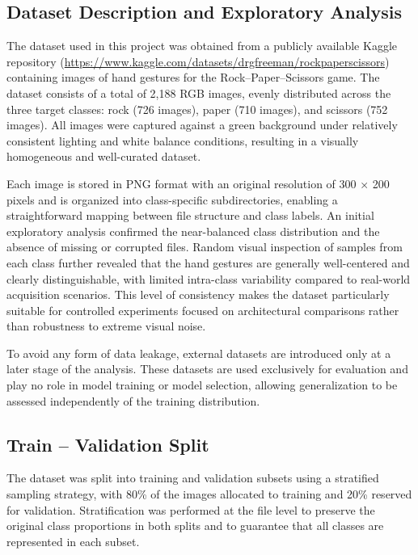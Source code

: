 \documentclass{article}
\begin{document}
\subsection{Dataset Description and Exploratory Analysis}

The dataset used in this project was obtained from a publicly available
Kaggle repository (\url{https://www.kaggle.com/datasets/drgfreeman/rockpaperscissors}) containing images of hand gestures for the
Rock--Paper--Scissors game. The dataset consists of a total of 2,188 RGB images,
evenly distributed across the three target classes: rock (726 images),
paper (710 images), and scissors (752 images). All images were captured
against a green background under relatively consistent lighting and
white balance conditions, resulting in a visually homogeneous and
well-curated dataset.

Each image is stored in PNG format with an original resolution of 300 ×
200 pixels and is organized into class-specific subdirectories, enabling
a straightforward mapping between file structure and class labels. An
initial exploratory analysis confirmed the near-balanced class
distribution and the absence of missing or corrupted files. Random
visual inspection of samples from each class further revealed that the
hand gestures are generally well-centered and clearly distinguishable,
with limited intra-class variability compared to real-world acquisition
scenarios. This level of consistency makes the dataset particularly
suitable for controlled experiments focused on architectural comparisons
rather than robustness to extreme visual noise.

To avoid any form of data leakage, external datasets are introduced only at a
later stage of the analysis. These datasets are used exclusively for evaluation
and play no role in model training or model selection, allowing generalization
to be assessed independently of the training distribution.

\subsection{Train -- Validation Split}

The dataset was split into training and validation subsets using a
stratified sampling strategy, with 80\% of the images allocated to
training and 20\% reserved for validation. Stratification was performed
at the file level to preserve the original class proportions in both
splits and to guarantee that all classes are represented in each subset.
\end{document}
